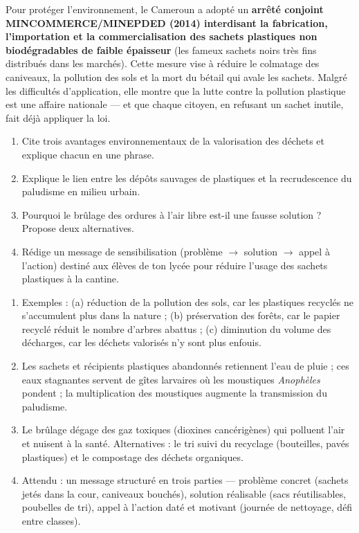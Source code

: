 \documentclass[11pt]{article}
\begin{document}
\begin{savaistu}
Pour protéger l'environnement, le Cameroun a adopté un \textbf{arrêté conjoint MINCOMMERCE/MINEPDED (2014) interdisant la fabrication, l'importation et la commercialisation des sachets plastiques non biodégradables de faible épaisseur} (les fameux sachets noirs très fins distribués dans les marchés). Cette mesure vise à réduire le colmatage des caniveaux, la pollution des sols et la mort du bétail qui avale les sachets. Malgré les difficultés d'application, elle montre que la lutte contre la pollution plastique est une affaire nationale — et que chaque citoyen, en refusant un sachet inutile, fait déjà appliquer la loi.
\end{savaistu}

\begin{exercice}
\begin{enumerate}
\item Cite trois avantages environnementaux de la valorisation des déchets et explique chacun en une phrase.
\item Explique le lien entre les dépôts sauvages de plastiques et la recrudescence du paludisme en milieu urbain.
\item Pourquoi le brûlage des ordures à l'air libre est-il une fausse solution ? Propose deux alternatives.
\item Rédige un message de sensibilisation (problème $\to$ solution $\to$ appel à l'action) destiné aux élèves de ton lycée pour réduire l'usage des sachets plastiques à la cantine.
\end{enumerate}
\end{exercice}

\begin{corrige}[Exercice]
\begin{enumerate}
\item Exemples : (a) réduction de la pollution des sols, car les plastiques recyclés ne s'accumulent plus dans la nature ; (b) préservation des forêts, car le papier recyclé réduit le nombre d'arbres abattus ; (c) diminution du volume des décharges, car les déchets valorisés n'y sont plus enfouis.
\item Les sachets et récipients plastiques abandonnés retiennent l'eau de pluie ; ces eaux stagnantes servent de gîtes larvaires où les moustiques \emph{Anophèles} pondent ; la multiplication des moustiques augmente la transmission du paludisme.
\item Le brûlage dégage des gaz toxiques (dioxines cancérigènes) qui polluent l'air et nuisent à la santé. Alternatives : le tri suivi du recyclage (bouteilles, pavés plastiques) et le compostage des déchets organiques.
\item Attendu : un message structuré en trois parties — problème concret (sachets jetés dans la cour, caniveaux bouchés), solution réalisable (sacs réutilisables, poubelles de tri), appel à l'action daté et motivant (journée de nettoyage, défi entre classes).
\end{enumerate}
\end{corrige}
\end{document}
